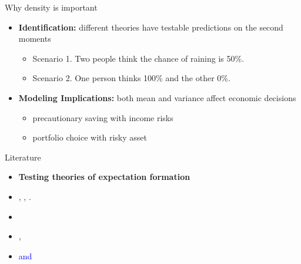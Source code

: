 \documentclass{beamer}
\begin{document}
\begin{frame}{Why density is important}
\begin{itemize}
\item \textbf{Identification:} different theories have testable predictions on the second moments   
	\begin{itemize}
		\item Scenario 1. Two people think the chance of raining is 50\%. 
		\item Scenario 2. One person thinks 100\% and the other 0\%. 
	\end{itemize}
\item \textbf{Modeling Implications:}  both mean and variance affect economic decisions
\begin{itemize}
	\item precautionary saving with income risks
	\item portfolio choice with risky asset
\end{itemize} 
\end{itemize}
\end{frame}

%

\begin{frame}{Literature}
\begin{itemize}
	\item \textbf{Testing theories of expectation formation}
	\item \citet{mankiw2003disagreement}, \citet{carroll2003macroeconomic}, \citet{branch2004theory}. 
	\item  \citet{coibion2018firms} 
	\item  \citet{malmendier2015learning}, \citet{das2017socioeconomic}
	\item \textcolor{blue}{\citet{coibion2012can} and \citet{fuhrer2018intrinsic}}
\end{itemize}

\end{frame}
\end{document}
